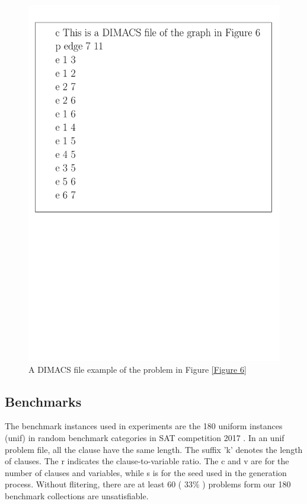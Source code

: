 \documentclass[12pt,a4paper,twoside]{scrartcl}
\numberwithin{equation}{section}
\begin{document}
\begin{figure}[h!] \begin{center}  \includegraphics[scale = 0.5]{1/Dimacs.pdf}      \caption{A DIMACS file example of the problem in Figure \ref{Figure 6}}      \end{center} \end{figure}  
\subsection{Benchmarks}
\label{benchmark}
The benchmark instances used in experiments are the 180 uniform instances (unif) in random benchmark categories in SAT competition 2017  \cite{balyo2017proceedings}. In an unif problem file, all the clause have the same length.
The suffix 'k'  denotes the length of clauses. The r indicates the clause-to-variable ratio. The c and v are for the number of clauses and variables, while s is for the seed used in the generation process.
 Without flitering, there are at least 60 ( $33\%$ ) problems form our 180 benchmark collections are unsatisfiable.
\end{document}
